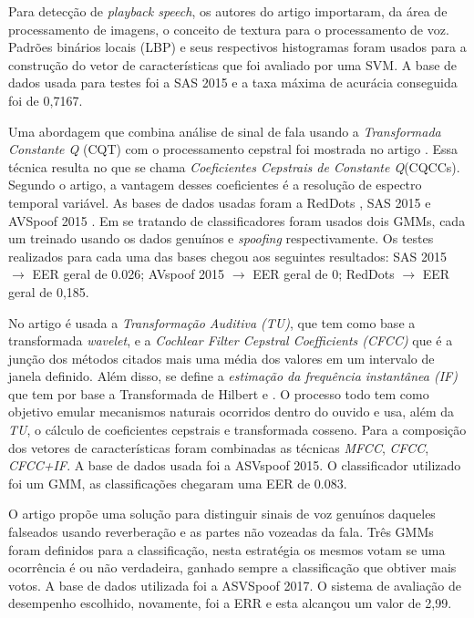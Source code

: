 		\par Para detecção de \textit{playback speech}, os autores do artigo  \cite{ISI:000473343500086} importaram, da área de processamento de imagens, o conceito de textura para o processamento de voz. Padrões binários locais (LBP) e seus respectivos histogramas foram usados para a construção do vetor de características que foi avaliado por uma SVM. A base de dados usada para testes foi a SAS 2015 e a taxa máxima de acurácia conseguida foi de 0,7167.\\
		
		\par Uma abordagem que combina análise de sinal de fala usando a \textit{Transformada Constante Q} (CQT) com o processamento cepstral foi mostrada no artigo \cite{TODISCO2017516}. Essa técnica resulta no que se chama \textit{Coeficientes Cepstrais de Constante Q}(CQCCs). Segundo o artigo, a vantagem desses coeficientes é a resolução de espectro temporal variável. As bases de dados usadas foram a RedDots \cite{redDots}, SAS 2015 e AVSpoof 2015 \cite{AVSpoof2015}. Em se tratando de classificadores foram usados dois GMMs, cada um treinado usando os dados genuínos e \textit{spoofing} respectivamente. Os testes realizados para cada uma das bases chegou aos seguintes resultados: SAS 2015 $\rightarrow$ EER geral de 0.026; AVspoof 2015 $\rightarrow$ EER geral de 0; RedDots $\rightarrow$ EER geral de 0,185.\\

		\par No artigo \cite{Patel2015} é usada a \textit{Transformação Auditiva (TU)}, que tem como base a transformada \textit{wavelet}, e a \textit{Cochlear Filter Cepstral Coefficients (CFCC)} que é a junção dos métodos citados mais uma média dos valores em um intervalo de janela definido. Além disso, se define a \textit{estimação da frequência instantânea (IF)} que tem por base a Transformada de Hilbert \cite{johansson1999hilbert} e \cite{kschischang2006hilbert}. O processo todo tem como objetivo emular mecanismos naturais ocorridos dentro do ouvido e usa, além da \textit{TU}, o cálculo de coeficientes cepstrais e transformada cosseno. Para a composição dos vetores de características foram combinadas as técnicas \textit{MFCC}, \textit{CFCC}, \textit{CFCC+IF}. A base de dados usada foi a ASVspoof 2015. O classificador utilizado foi um GMM, as classificações chegaram uma EER de 0.083.\\

		\par O artigo \cite{ISI:000490497200068} propõe uma solução para distinguir sinais de voz genuínos daqueles falseados usando reverberação e as partes não vozeadas da fala. Três GMMs foram definidos para a classificação, nesta estratégia os mesmos votam se uma ocorrência é ou não verdadeira, ganhado sempre a classificação que obtiver mais votos. A base de dados utilizada foi a ASVSpoof 2017. O sistema de avaliação de desempenho escolhido, novamente, foi a ERR e esta alcançou um valor de 2,99.\\
		
